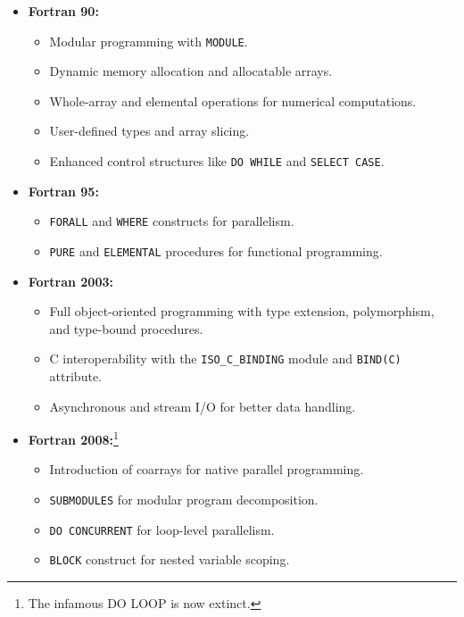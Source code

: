 \begin{itemize}
    \item \textbf{Fortran 90:}
    \begin{itemize}
        \item Modular programming with \texttt{MODULE}.
        \item Dynamic memory allocation and allocatable arrays.
        \item Whole-array and elemental operations for numerical computations.
        \item User-defined types and array slicing.
        \item Enhanced control structures like \texttt{DO WHILE} and \texttt{SELECT CASE}.
    \end{itemize}

    \item \textbf{Fortran 95:}
    \begin{itemize}
        \item \texttt{FORALL} and \texttt{WHERE} constructs for parallelism.
        \item \texttt{PURE} and \texttt{ELEMENTAL} procedures for functional programming.
    \end{itemize}

    \item \textbf{Fortran 2003:}
    \begin{itemize}
        \item Full object-oriented programming with type extension, polymorphism, and type-bound procedures.
        \item C interoperability with the \texttt{ISO\_C\_BINDING} module and \texttt{BIND(C)} attribute.
        \item Asynchronous and stream I/O for better data handling.
    \end{itemize}

    \item \textbf{Fortran 2008:}\footnote{The infamous DO LOOP is now extinct.}
    \begin{itemize}
        \item Introduction of coarrays for native parallel programming.
        \item \texttt{SUBMODULES} for modular program decomposition.
        \item \texttt{DO CONCURRENT} for loop-level parallelism.
        \item \texttt{BLOCK} construct for nested variable scoping.
    \end{itemize}


\end{itemize}
